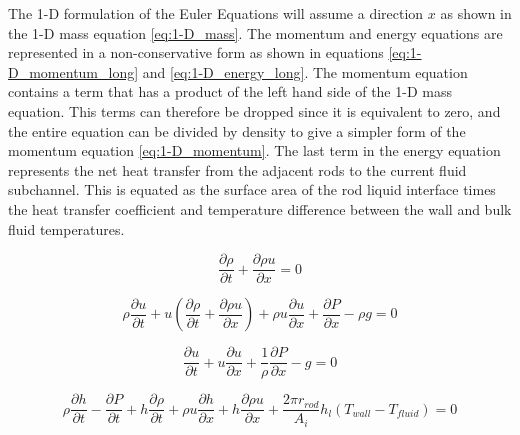     The 1-D formulation of the Euler Equations will assume a direction $x$ as shown
    in the 1-D mass equation \eqref{eq:1-D_mass}. The momentum and energy equations
    are represented in a non-conservative form as shown in equations
    \eqref{eq:1-D_momentum_long} and \eqref{eq:1-D_energy_long}. The momentum
    equation contains a term that has a product of the left hand side of the 1-D
    mass equation. This terms can therefore be dropped since it is equivalent
    to zero, and the entire equation can be divided by density to give a simpler
    form of the momentum equation \eqref{eq:1-D_momentum}. The last term in the
    energy equation represents the net heat transfer from the adjacent rods to
    the current fluid subchannel. This is equated as the surface area of
    the rod liquid interface times the heat transfer coefficient and temperature
    difference between the wall and bulk fluid temperatures. 
    
    \begin{equation}
    	\label{eq:1-D_mass}
    	\dfrac{ \partial \rho }{ \partial t} +
    	\dfrac{ \partial \rho u}{\partial x} = 0
    \end{equation}
    
    \begin{equation}
    	\label{eq:1-D_momentum_long}
    	\rho \dfrac{ \partial u }{ \partial t } + 
    	u \left(  \dfrac{ \partial \rho }{ \partial t } +
    	          \dfrac{ \partial \rho u }{\partial x} \right) +
    	\rho u \dfrac{ \partial u}{ \partial x} + 
    	\dfrac{ \partial P}{ \partial x}   - \rho g
    	= 0
    \end{equation}
    
    \begin{equation}
    	\label{eq:1-D_momentum}
    	\dfrac{ \partial u }{ \partial t } + 
    	u \dfrac{ \partial u }{ \partial x } + 
    	\dfrac{1}{ \rho } \dfrac{ \partial P }{ \partial x } - g  
    	= 0
    \end{equation}
    
    \begin{equation}
    	\label{eq:1-D_energy_long}
    	\rho \frac{ \partial  h}{\partial t} -
    	     \frac{ \partial  P}{\partial t} + 
    	h    \frac{ \partial  \rho}{\partial t} +
    	\rho u \frac{ \partial h }{ \partial x} +
    	h    \frac{ \partial \rho u }{ \partial x} 
    	+ \frac{2\pi r_{rod}}{A_{i}}h_{l}\left(T_{wall}-T_{fluid}\right)
    	= 0
    \end{equation}
    
